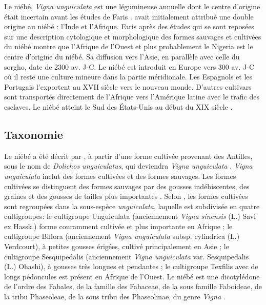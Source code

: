 \documentclass[a4paper,11pt]{article}
\begin{document}
Le niébé, \emph{Vigna unguiculata} est une légumineuse annuelle dont
le centre d'origine était incertain avant les études de Faris
\cite{FARIS_1963,FARIS_1965}.  avait initialement
attribué une double origine au niébé : l'Inde et l'Afrique. Faris
\citeyear{FARIS_1963,FARIS_1965} après des études qui se sont reposées
sur une description cytologique et morphologique des formes sauvages
et cultivées du niébé montre que l'Afrique de l'Ouest et plus
probablement le Nigeria est le centre d'origine du niébé. Sa diffusion
vers l'Asie, en parallèle avec celle du sorgho, date de 2300
av. J-C. Le niébé est introduit en Europe vers 300 av. J-C où il reste
une culture mineure dans la partie méridionale. Les Espagnols et les
Portugais l'exportent au \textsc{XVII}\ieme{} siècle vers le nouveau
monde. D'autres cultivars sont transportés directement de l'Afrique
vers l'Amérique latine avec le trafic des esclaves. Le niébé atteint
le Sud des États-Unis au début du \textsc{XIX}\ieme{} siècle
\cite{Sawadogo_2009}.

\subsection{Taxonomie}

Le niébé a été décrit par , à partir
d'une forme cultivée provenant des Antilles, sous le nom de
\emph{Dolichos unguiculatus}, qui deviendra \emph{Vigna unguiculata}
\cite{Pasquet_1997}. \emph{Vigna unguiculata} inclut des formes
cultivées et des formes sauvages. Les formes cultivées se distinguent
des formes sauvages par des gousses indéhiscentes, des graines et des
gousses de tailles plus importantes \cite{Lush_1981}. Selon
, les formes cultivées sont regroupées dans
la sous-espèce \emph{unguiculata}, laquelle est subdivisée en quatre
cultigroupes: le cultigroupe Unguiculata (anciennement \emph{Vigna
  sinensis} (L.) Savi ex Hassk.)  forme couramment cultivée et plus
importante en Afrique ; le cultigroupe Biflora (anciennement
\emph{Vigna unguiculata} subsp. cylindrica (L.) Verdcourt), à petites
gousses érigées, cultivé principalement en Asie ; le cultigroupe
Sesquipedalis (anciennement \emph{Vigna unguiculata}
var. Sesquipedalis (L.) Ohashi), à gousses très longues et pendantes ;
le cultigroupe Texfilis avec de longs pédoncules est présent en
Afrique de l'Ouest. Le niébé est une dicotylédone de l'ordre des
Fabales, de la famille des Fabaceae, de la sous famille Faboideae, de
la tribu Phaseoleae, de la sous tribu des Phaseolinae, du genre
\emph{Vigna} \cite{Verdcourt_1970, Marechal_1978}.
\end{document}
